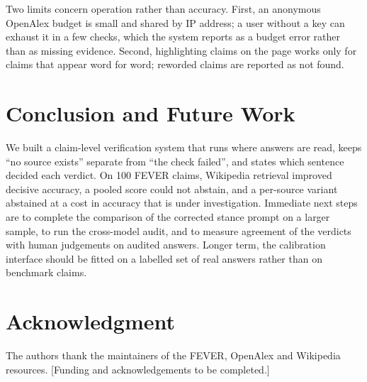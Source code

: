 \documentclass[conference]{IEEEtran}
\begin{document}
Two limits concern operation rather than accuracy. First, an anonymous OpenAlex budget is small and shared by IP address; a user without a key can exhaust it in a few checks, which the system reports as a budget error rather than as missing evidence. Second, highlighting claims on the page works only for claims that appear word for word; reworded claims are reported as not found.

\section{Conclusion and Future Work}
We built a claim-level verification system that runs where answers are read, keeps ``no source exists'' separate from ``the check failed'', and states which sentence decided each verdict. On 100 FEVER claims, Wikipedia retrieval improved decisive accuracy, a pooled score could not abstain, and a per-source variant abstained at a cost in accuracy that is under investigation. Immediate next steps are to complete the comparison of the corrected stance prompt on a larger sample, to run the cross-model audit, and to measure agreement of the verdicts with human judgements on audited answers. Longer term, the calibration interface should be fitted on a labelled set of real answers rather than on benchmark claims.

\section*{Acknowledgment}
The authors thank the maintainers of the FEVER, OpenAlex and Wikipedia resources. [Funding and acknowledgements to be completed.]
\end{document}
